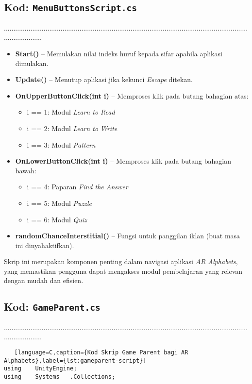 \begin{itemize}
\begin{itemize}
\begin{itemize}
\begin{itemize}
\begin{itemize}
\begin{itemize}
\begin{itemize}
\begin{itemize}
\begin{flushleft}
\subsection*{Kod: \texttt{MenuButtonsScript.cs}}
.....................................................................................................................................................
\begin{itemize}
  \item \textbf{Start()} – Memulakan nilai indeks huruf kepada sifar apabila aplikasi dimulakan.
  \item \textbf{Update()} – Menutup aplikasi jika kekunci \textit{Escape} ditekan.
  \item \textbf{OnUpperButtonClick(int i)} – Memproses klik pada butang bahagian atas:
  \begin{itemize}
    \item i == 1: Modul \textit{Learn to Read}
    \item i == 2: Modul \textit{Learn to Write}
    \item i == 3: Modul \textit{Pattern}
  \end{itemize}
  \item \textbf{OnLowerButtonClick(int i)} – Memproses klik pada butang bahagian bawah:
  \begin{itemize}
    \item i == 4: Paparan \textit{Find the Answer}
    \item i == 5: Modul \textit{Puzzle}
    \item i == 6: Modul \textit{Quiz}
  \end{itemize}
  \item \textbf{randomChanceInterstitial()} – Fungsi untuk panggilan iklan (buat masa ini dinyahaktifkan).
\end{itemize}

\bigskip

Skrip ini merupakan komponen penting dalam navigasi aplikasi \textit{AR Alphabets}, yang memastikan pengguna dapat mengakses modul pembelajaran yang relevan dengan mudah dan efisien.

\clearpage

\subsection*{Kod: \texttt{GameParent.cs}}
.....................................................................................................................................................
\begin{lstlisting}   [language=C,caption={Kod Skrip Game Parent bagi AR Alphabets},label={lst:gameparent-script}]
using    UnityEngine;
using    Systems   .Collections;


\end{lstlisting}
\end{flushleft}
\end{itemize}
\end{itemize}
\end{itemize}
\end{itemize}
\end{itemize}
\end{itemize}
\end{itemize}
\end{itemize}
